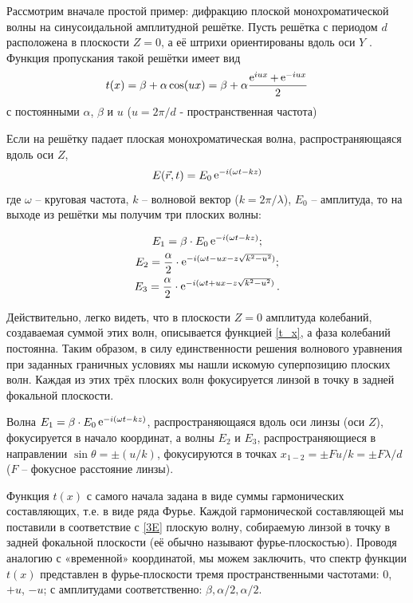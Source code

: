 \documentclass[a5paper,10pt, twoside]{article} %
\begin{document}
		Рассмотрим вначале простой пример: дифракцию плоской монохроматической волны на синусоидальной
		амплитудной решётке. Пусть решётка с периодом $d$ расположена в плоскости $Z = 0$, а её штрихи 
		ориентированы вдоль оси $Y$ . Функция пропускания такой решётки имеет вид
		\begin{equation}\label{t_x}
			t(x) = \beta + \alpha \cos (ux) = \beta + \alpha \frac{\mathop{\mathrm e}\nolimits^{iux} + \mathop{\mathrm e}\nolimits^{-iux}}{2}
		\end{equation}
		с постоянными $\alpha$, $\beta$ и $u$ ($u = 2 \pi / d$ - пространственная частота) 
		
		Если на решётку падает плоская монохроматическая волна, распространяющаяся вдоль оси $Z$,
		\begin{equation}
			E(\vec{r}, t) = E_0 \mathop{\mathrm e}\nolimits^{-i(\omega t - kz)}
		\end{equation}
		где $\omega$ -- круговая частота, $k$ -- волновой вектор ($k = 2\pi / \lambda$), $E_0$ -- 
		амплитуда, то на выходе из решётки мы получим три плоских волны:
		
		\begin{equation}\label{3E}
		\begin{gathered} 
		    E_1 = \beta \cdot E_0 \mathop{\mathrm e}\nolimits^{-i(\omega t - kz)}; \\
		    E_2 = \frac{\alpha}{2} \cdot \mathop{\mathrm e}\nolimits^{-i(\omega t - ux - z \sqrt{k^2-u^2})}; \\
		    E_3 = \frac{\alpha}{2} \cdot \mathop{\mathrm e}\nolimits^{-i(\omega t + ux - z \sqrt{k^2-u^2})}.
		 \end{gathered}
		\end{equation}
		
		Действительно, легко видеть, что в плоскости $Z = 0$ амплитуда колебаний, создаваемая суммой 
		этих волн, описывается функцией \eqref{t_x}, а фаза колебаний постоянна. Таким образом, в силу 
		единственности решения волнового уравнения при заданных граничных условиях мы нашли искомую 
		суперпозицию плоских волн. Каждая из этих трёх плоских волн фокусируется линзой в точку в 
		задней фокальной плоскости.
		
		Волна $E_1 = \beta \cdot E_0 \mathop{\mathrm e}\nolimits^{-i(\omega t - kz)}$, распространяющаяся вдоль оси линзы 
		(оси $Z$), фокусируется в начало координат, а волны $E_2$ и $E_3$, распространяющиеся в 
		направлении $\sin{\theta} = \pm (u/k)$, фокусируются в точках 
		$x_{1-2} = \pm F u / k = \pm F \lambda / d$ ($F$ -- фокусное расстояние линзы).
		
		
		Функция $t(x)$ с самого начала задана в виде суммы гармонических составляющих, т.е. в виде 
		ряда Фурье. Каждой гармонической составляющей мы поставили в соответствие с \eqref{3E} 
		плоскую волну, собираемую линзой в точку в задней фокальной плоскости (её обычно называют 
		фурье-плоскостью). Проводя аналогию с «временной» координатой, мы можем заключить, что спектр 
		функции $t(x)$ представлен в фурье-плоскости тремя пространственными частотами: 0, $+u$, $-u$; 
		с амплитудами соответственно: $\beta, \alpha / 2, \alpha / 2$.
		
\end{document}
